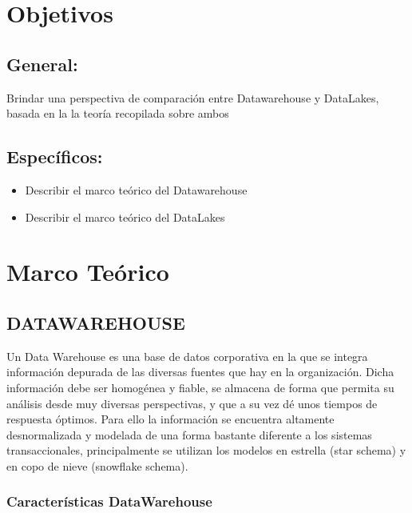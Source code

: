 \documentclass[%
 reprint,
 amsmath,amssymb,
 aps,
]{revtex4-1}
\begin{document}
\section{Objetivos}\label{sec:2}
\subsection{General:}
Brindar una perspectiva de comparación entre Datawarehouse y DataLakes, basada en la la teoría recopilada sobre ambos 
\subsection{Específicos:}
\begin{itemize}
	\item Describir el marco teórico del Datawarehouse
	\item Describir el marco teórico del DataLakes
\end{itemize}

\section {Marco Teórico}

\subsection{DATAWAREHOUSE}	
Un Data Warehouse es una base de datos corporativa en la que se integra información depurada de las diversas fuentes que hay en la organización. Dicha
información debe ser homogénea y fiable, se almacena de forma que permita su análisis desde muy diversas perspectivas, y que a su vez dé unos tiempos de
respuesta óptimos. Para ello la información se encuentra altamente desnormalizada y modelada de una forma bastante diferente a los sistemas transaccionales,
principalmente se utilizan los modelos en estrella (star schema) y en copo de nieve (snowflake schema).\cite{robles3}

\subsubsection{Características DataWarehouse}	
\end{document}

